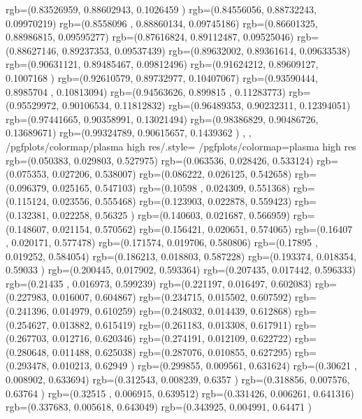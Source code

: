 {{{		  rgb=(0.83526959,  0.88602943,  0.1026459 )
		  rgb=(0.84556056,  0.88732243,  0.09970219)
		  rgb=(0.8558096 ,  0.88860134,  0.09745186)
		  rgb=(0.86601325,  0.88986815,  0.09595277)
		  rgb=(0.87616824,  0.89112487,  0.09525046)
		  rgb=(0.88627146,  0.89237353,  0.09537439)
		  rgb=(0.89632002,  0.89361614,  0.09633538)
		  rgb=(0.90631121,  0.89485467,  0.09812496)
		  rgb=(0.91624212,  0.89609127,  0.1007168 )
		  rgb=(0.92610579,  0.89732977,  0.10407067)
		  rgb=(0.93590444,  0.8985704 ,  0.10813094)
		  rgb=(0.94563626,  0.899815  ,  0.11283773)
		  rgb=(0.95529972,  0.90106534,  0.11812832)
		  rgb=(0.96489353,  0.90232311,  0.12394051)
		  rgb=(0.97441665,  0.90358991,  0.13021494)
		  rgb=(0.98386829,  0.90486726,  0.13689671)
		  rgb=(0.99324789,  0.90615657,  0.1439362 )
		},
	},
	/pgfplots/colormap/plasma high res/.style={%
		/pgfplots/colormap={plasma high res}{%
      rgb=(0.050383,  0.029803,  0.527975)
      rgb=(0.063536,  0.028426,  0.533124)
      rgb=(0.075353,  0.027206,  0.538007)
      rgb=(0.086222,  0.026125,  0.542658)
      rgb=(0.096379,  0.025165,  0.547103)
      rgb=(0.10598 ,  0.024309,  0.551368)
      rgb=(0.115124,  0.023556,  0.555468)
      rgb=(0.123903,  0.022878,  0.559423)
      rgb=(0.132381,  0.022258,  0.56325 )
      rgb=(0.140603,  0.021687,  0.566959)
      rgb=(0.148607,  0.021154,  0.570562)
      rgb=(0.156421,  0.020651,  0.574065)
      rgb=(0.16407 ,  0.020171,  0.577478)
      rgb=(0.171574,  0.019706,  0.580806)
      rgb=(0.17895 ,  0.019252,  0.584054)
      rgb=(0.186213,  0.018803,  0.587228)
      rgb=(0.193374,  0.018354,  0.59033 )
      rgb=(0.200445,  0.017902,  0.593364)
      rgb=(0.207435,  0.017442,  0.596333)
      rgb=(0.21435 ,  0.016973,  0.599239)
      rgb=(0.221197,  0.016497,  0.602083)
      rgb=(0.227983,  0.016007,  0.604867)
      rgb=(0.234715,  0.015502,  0.607592)
      rgb=(0.241396,  0.014979,  0.610259)
      rgb=(0.248032,  0.014439,  0.612868)
      rgb=(0.254627,  0.013882,  0.615419)
      rgb=(0.261183,  0.013308,  0.617911)
      rgb=(0.267703,  0.012716,  0.620346)
      rgb=(0.274191,  0.012109,  0.622722)
      rgb=(0.280648,  0.011488,  0.625038)
      rgb=(0.287076,  0.010855,  0.627295)
      rgb=(0.293478,  0.010213,  0.62949 )
      rgb=(0.299855,  0.009561,  0.631624)
      rgb=(0.30621 ,  0.008902,  0.633694)
      rgb=(0.312543,  0.008239,  0.6357  )
      rgb=(0.318856,  0.007576,  0.63764 )
      rgb=(0.32515 ,  0.006915,  0.639512)
      rgb=(0.331426,  0.006261,  0.641316)
      rgb=(0.337683,  0.005618,  0.643049)
      rgb=(0.343925,  0.004991,  0.64471 )
}}}
